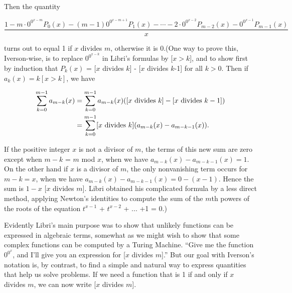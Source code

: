 \documentclass[10pt]{article}
\begin{document}
Then the quantity

\begin{equation*}
\frac{1-m \cdot {0}^{0^{x-m}} P_0(x) - (m-1) {0}^{0^{x-m+1}} P_1(x) - \cdots - 2 \cdot {0}^{0^{x-2}} P_{m-2} (x) - {0}^{0^{x-1}} P_{m-1} (x)}{x}
\end{equation*} 

turns out to equal 1 if $x$ divides $m$, otherwise it is 0.(One way to prove this, 
Iverson-wise, is to replace $0^{0^{x-k}}$ in Libri’s formulas by [$x > k$], and to show first 
by induction that $P_k(x)$ = [$x$ divides $k$] - [$x$ divides $k$-1] for all $ k>0$. Then if 
$a_{k}(x) = k [x > k]$, we have

\begin{align}
\sum_{k=0}^{m-1} a_{m-k}(x) &=\sum_{k=0}^{m-1} a_{m-k}(x) ([x \text{ divides } k] -[x \text{ divides } k - 1])\notag \\ &= \sum_{k=0}^{m-1} [x \text{ divides } k] (a_{m-k} (x) - a_{m-k-1} (x))\notag.
\end{align}
 

If the positive integer $x$ is not a divisor of $m$, the terms of this new sum are zero except when
$m-k$ = $m$ mod $x$, when we have $a_{m-k}(x)-a_{m-k-1}(x) = 1$. On the other hand if $x$ is a divisor of $m$,
the only nonvanishing term occurs for $m-k = x$, when we have $a_{m-k}(x)-a_{m-k-1}(x) = 0-(x-1)$.
Hence the sum is $1-x$ [$x$ divides $m$]. Libri obtained his complicated formula by a less direct method,
applying Newton’s identities to compute the sum of the $m$th powers of the roots of the equation $t^{x-1}$ + $t^{x-2}$ + ... +1 = 0.)

Evidently Libri’s main purpose was to show that unlikely functions can be expressed in algebraic
terms, somewhat as we might wish to show that some complex functions can be computed
by a Turing Machine. “Give me the function $0^{0^{x}}$, and I'll give you an expression for [$x$ divides $m$].”
But our goal with Iverson’s notation is, by contrast, to find a simple and natural way to express
quantities that help us solve problems. If we need a function that is 1 if and only if $x$ divides $m$,
we can now write [$x$ divides $m$].
\end{document}
